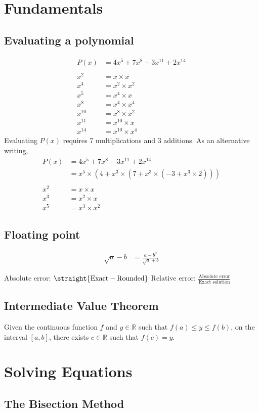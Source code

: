 \documentclass[12pt]{article}
\begin{document}
\section*{Fundamentals}

\subsection*{Evaluating a polynomial}
\begin{align*}
    P(x) &= 4x^5 + 7x^8 - 3x^{11} + 2x^{14} \\
    \\
    x^2 &= x \times x \\
    x^4 &= x^2 \times x^2 \\
    x^5 &= x^4 \times x \\
    x^8 &= x^4 \times x^4 \\
    x^{10} &= x^8 \times x^2 \\
    x^{11} &= x^{10} \times x \\
    x^{14} &= x^{10} \times x^4
\end{align*}
Evaluating $P(x)$ requires 7 multiplications and 3 additions. As an alternative writing,
\begin{align*}
    P(x) &= 4x^5 + 7x^8 - 3x^{11} + 2x^{14} \\
    &= x^5 \times (4 + x^3 \times (7 + x^3 \times (-3 + x^3 \times 2))) \\
    \\
    x^2 &= x \times x \\
    x^3 &= x^2 \times x \\
    x^5 &= x^3 \times x^2
\end{align*}

\subsection*{Floating point}
\begin{align*}
    \sqrt{a} - b &= \frac{a - b^2}{\sqrt{a} + b}
\end{align*}

Absolute error: $\straight{\text{Exact} - \text{Rounded}}$
Relative error: $\frac{\text{Absolute error}}{\text{Exact solution}}$

\subsection*{Intermediate Value Theorem}
Given the continuous function $f$ and $y \in \mathbb{R}$ such that $f(a) \leq y \leq f(b)$, on the interval $[a, b]$, there exists $c \in \mathbb{R}$ such that $f(c) = y$.

\section*{Solving Equations}

\subsection*{The Bisection Method}
\end{document}
